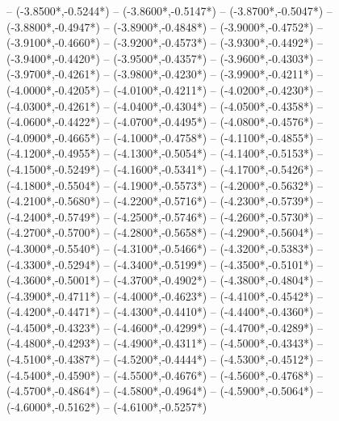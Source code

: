 {	-- ({-3.8500*\dx},{-0.5244*\dy})
	-- ({-3.8600*\dx},{-0.5147*\dy})
	-- ({-3.8700*\dx},{-0.5047*\dy})
	-- ({-3.8800*\dx},{-0.4947*\dy})
	-- ({-3.8900*\dx},{-0.4848*\dy})
	-- ({-3.9000*\dx},{-0.4752*\dy})
	-- ({-3.9100*\dx},{-0.4660*\dy})
	-- ({-3.9200*\dx},{-0.4573*\dy})
	-- ({-3.9300*\dx},{-0.4492*\dy})
	-- ({-3.9400*\dx},{-0.4420*\dy})
	-- ({-3.9500*\dx},{-0.4357*\dy})
	-- ({-3.9600*\dx},{-0.4303*\dy})
	-- ({-3.9700*\dx},{-0.4261*\dy})
	-- ({-3.9800*\dx},{-0.4230*\dy})
	-- ({-3.9900*\dx},{-0.4211*\dy})
	-- ({-4.0000*\dx},{-0.4205*\dy})
	-- ({-4.0100*\dx},{-0.4211*\dy})
	-- ({-4.0200*\dx},{-0.4230*\dy})
	-- ({-4.0300*\dx},{-0.4261*\dy})
	-- ({-4.0400*\dx},{-0.4304*\dy})
	-- ({-4.0500*\dx},{-0.4358*\dy})
	-- ({-4.0600*\dx},{-0.4422*\dy})
	-- ({-4.0700*\dx},{-0.4495*\dy})
	-- ({-4.0800*\dx},{-0.4576*\dy})
	-- ({-4.0900*\dx},{-0.4665*\dy})
	-- ({-4.1000*\dx},{-0.4758*\dy})
	-- ({-4.1100*\dx},{-0.4855*\dy})
	-- ({-4.1200*\dx},{-0.4955*\dy})
	-- ({-4.1300*\dx},{-0.5054*\dy})
	-- ({-4.1400*\dx},{-0.5153*\dy})
	-- ({-4.1500*\dx},{-0.5249*\dy})
	-- ({-4.1600*\dx},{-0.5341*\dy})
	-- ({-4.1700*\dx},{-0.5426*\dy})
	-- ({-4.1800*\dx},{-0.5504*\dy})
	-- ({-4.1900*\dx},{-0.5573*\dy})
	-- ({-4.2000*\dx},{-0.5632*\dy})
	-- ({-4.2100*\dx},{-0.5680*\dy})
	-- ({-4.2200*\dx},{-0.5716*\dy})
	-- ({-4.2300*\dx},{-0.5739*\dy})
	-- ({-4.2400*\dx},{-0.5749*\dy})
	-- ({-4.2500*\dx},{-0.5746*\dy})
	-- ({-4.2600*\dx},{-0.5730*\dy})
	-- ({-4.2700*\dx},{-0.5700*\dy})
	-- ({-4.2800*\dx},{-0.5658*\dy})
	-- ({-4.2900*\dx},{-0.5604*\dy})
	-- ({-4.3000*\dx},{-0.5540*\dy})
	-- ({-4.3100*\dx},{-0.5466*\dy})
	-- ({-4.3200*\dx},{-0.5383*\dy})
	-- ({-4.3300*\dx},{-0.5294*\dy})
	-- ({-4.3400*\dx},{-0.5199*\dy})
	-- ({-4.3500*\dx},{-0.5101*\dy})
	-- ({-4.3600*\dx},{-0.5001*\dy})
	-- ({-4.3700*\dx},{-0.4902*\dy})
	-- ({-4.3800*\dx},{-0.4804*\dy})
	-- ({-4.3900*\dx},{-0.4711*\dy})
	-- ({-4.4000*\dx},{-0.4623*\dy})
	-- ({-4.4100*\dx},{-0.4542*\dy})
	-- ({-4.4200*\dx},{-0.4471*\dy})
	-- ({-4.4300*\dx},{-0.4410*\dy})
	-- ({-4.4400*\dx},{-0.4360*\dy})
	-- ({-4.4500*\dx},{-0.4323*\dy})
	-- ({-4.4600*\dx},{-0.4299*\dy})
	-- ({-4.4700*\dx},{-0.4289*\dy})
	-- ({-4.4800*\dx},{-0.4293*\dy})
	-- ({-4.4900*\dx},{-0.4311*\dy})
	-- ({-4.5000*\dx},{-0.4343*\dy})
	-- ({-4.5100*\dx},{-0.4387*\dy})
	-- ({-4.5200*\dx},{-0.4444*\dy})
	-- ({-4.5300*\dx},{-0.4512*\dy})
	-- ({-4.5400*\dx},{-0.4590*\dy})
	-- ({-4.5500*\dx},{-0.4676*\dy})
	-- ({-4.5600*\dx},{-0.4768*\dy})
	-- ({-4.5700*\dx},{-0.4864*\dy})
	-- ({-4.5800*\dx},{-0.4964*\dy})
	-- ({-4.5900*\dx},{-0.5064*\dy})
	-- ({-4.6000*\dx},{-0.5162*\dy})
	-- ({-4.6100*\dx},{-0.5257*\dy})
}
